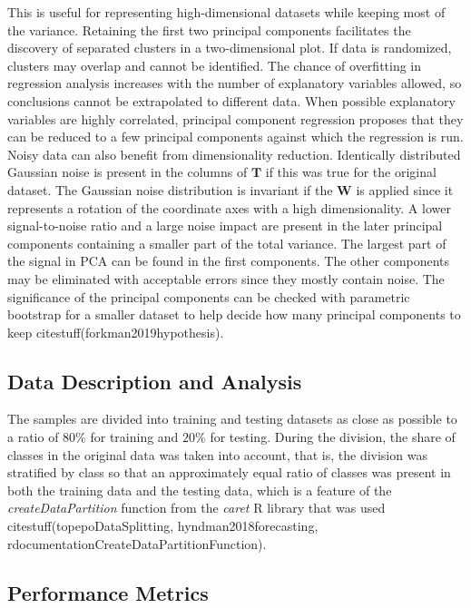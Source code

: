 \documentclass[preprint,12pt]{elsarticle}
\begin{document}
This is useful for representing high-dimensional datasets while keeping most of the variance. Retaining the first two principal components facilitates the discovery of separated clusters in a two-dimensional plot. If data is randomized, clusters may overlap and cannot be identified. The chance of overfitting in regression analysis increases with the number of explanatory variables allowed, so conclusions cannot be extrapolated to different data. When possible explanatory variables are highly correlated, principal component regression proposes that they can be reduced to a few principal components against which the regression is run. Noisy data can also benefit from dimensionality reduction. Identically distributed Gaussian noise is present in the columns of $\mathbf{T}$ if this was true for the original dataset. The Gaussian noise distribution is invariant if the $\mathbf{W}$ is applied since it represents a rotation of the coordinate axes with a high dimensionality. A lower signal-to-noise ratio and a large noise impact are present in the later principal components containing a smaller part of the total variance. The largest part of the signal in PCA can be found in the first components. The other components may be eliminated with acceptable errors since they mostly contain noise. The significance of the principal components can be checked with parametric bootstrap for a smaller dataset to help decide how many principal components to keep citestuff(forkman2019hypothesis).

\subsection{Data Description and Analysis}

The samples are divided into training and testing datasets as close as possible to a ratio of $80\%$ for training and $20\%$ for testing. During the division, the share of classes in the original data was taken into account, that is, the division was stratified by class so that an approximately equal ratio of classes was present in both the training data and the testing data, which is a feature of the \textit{createDataPartition} function from the \textit{caret} R library that was used citestuff(topepoDataSplitting, hyndman2018forecasting, rdocumentationCreateDataPartitionFunction).

\subsection{Performance Metrics}
\end{document}
